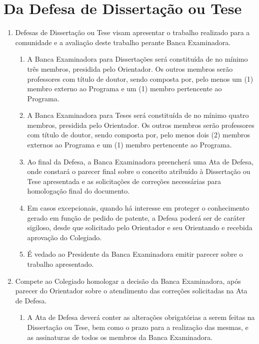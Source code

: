 \documentclass{article}
\newcommand{\singleitem}{\item[Parágrafo Único.]}
\newcommand{\grupoMenor}{Colegiado\xspace}
\begin{document}
\section{Da Defesa de Dissertação ou Tese}

\begin{enumerate}
	\item Defesas de Dissertação ou Tese visam apresentar o trabalho realizado para a comunidade e a avaliação deste trabalho perante Banca Examinadora.
	\begin{enumerate}
		\item A Banca Examinadora para Dissertações será constituída de no mínimo três membros, presidida pelo Orientador. Os outros membros serão professores com título de doutor, sendo composta por, pelo menos um (1) membro externo ao Programa e um (1) membro pertencente ao Programa.

		\item A Banca Examinadora para Teses será constituída de no mínimo quatro membros, presidida pelo Orientador. Os outros membros serão professores com título de doutor, sendo composta por, pelo menos dois (2) membros externos ao Programa e um (1) membro pertencente ao Programa.

		\item Ao final da Defesa, a Banca Examinadora preencherá uma Ata de Defesa, onde constará o parecer final sobre o conceito atribuído à Dissertação ou Tese apresentada e as solicitações de correções necessárias para homologação final do documento.

		\item Em casos excepcionais, quando há interesse em proteger o conhecimento gerado em função de pedido de patente, a Defesa poderá ser de caráter sigiloso, desde que solicitado pelo Orientador e seu Orientando e recebida aprovação do \grupoMenor.

		\item É vedado ao Presidente da Banca Examinadora emitir parecer sobre o trabalho apresentado.
	\end{enumerate}

	\item Compete ao \grupoMenor  homologar a decisão da Banca Examinadora, após parecer do Orientador sobre o atendimento das correções solicitadas na Ata de Defesa.
	\begin{enumerate}
		\singleitem A Ata de Defesa deverá conter as alterações obrigatórias a serem feitas na Dissertação ou Tese, bem como o prazo para a realização das mesmas, e as assinaturas de todos os membros da Banca Examinadora.
	\end{enumerate}


\end{enumerate}
\end{document}
